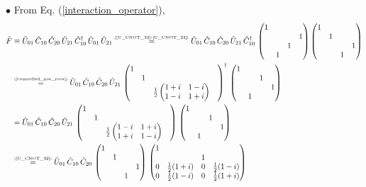 \documentclass[11pt]{article}
\numberwithin{equation}{section} %
\numberwithin{figure}{section} %
\newcommand\numeq[1] %
  {\stackrel{\scriptscriptstyle(\mkern-1.5mu#1\mkern-1.5mu)}{=}}
\begin{document}
\begin{appendices}
\noindent $\bullet$ From Eq. (\ref{interaction_operator}), 
\begin{equation} \label{F_operator}
\begin{split}
\hat{F}
&	\equiv\hat{U}_{01}\,\hat{C}_{10}\,\hat{C}_{20}\,\hat{U}_{21}\,\hat{C}_{10}^\dagger\,\hat{U}_{01}\,\hat{U}_{21} \numeq{\textrm{\ref{U_CNOT_32}-\ref{U_CNOT_23}}} \hat{U}_{01}\,\hat{C}_{10}\,\hat{C}_{20}\,\hat{U}_{21}\,\hat{C}_{10}^\dagger\,\begin{pmatrix} 1&&&\\ &&&1\\ &&1&\\ &1&&\end{pmatrix}\begin{pmatrix} 1&&&\\ &1&&\\ &&&1\\ &&1&\end{pmatrix}\\
&	\numeq{\textrm{\ref{controlled_not_root}}} \hat{U}_{01}\,\hat{C}_{10}\,\hat{C}_{20}\,\hat{U}_{21}\,\begin{pmatrix}1&&&\\ &1&&\\ &&\frac{1}{2}\begin{pmatrix} 1+i & 1-i \\ 1-i & 1+i
\end{pmatrix}\end{pmatrix}^ \dagger\,\begin{pmatrix} 1&&&\\&&1&\\ &&&1\\ &1&&\end{pmatrix}\\
&	=\hat{U}_{01}\,\hat{C}_{10}\,\hat{C}_{20}\,\hat{U}_{21}\,\begin{pmatrix}1&&&\\ &1&&\\ &&\frac{1}{2}\begin{pmatrix} 1-i & 1+i \\ 1+i & 1-i
\end{pmatrix}\end{pmatrix}\,\begin{pmatrix} 1&&&\\&&1&\\ &&&1\\ &1&&\end{pmatrix}\\
&	\numeq{\textrm{\ref{U_CNOT_32}}} \hat{U}_{01}\,\hat{C}_{10}\,\hat{C}_{20}\,\begin{pmatrix} 1&&&\\&1&&\\ &&&1\\ &&1&\end{pmatrix}\,\begin{pmatrix}1&&&\\ &&1&\\ 0&\frac{1}{2}(1+i)&0&\frac{1}{2}(1-i)\\0&\frac{1}{2}(1-i)&0&\frac{1}{2}(1+i)\end{pmatrix}\\

\end{split}
\end{equation}
\end{appendices}
\end{document}
